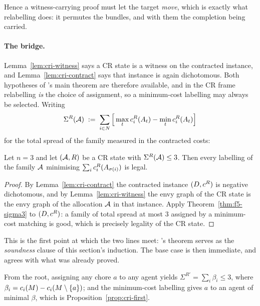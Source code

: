Hence a witness-carrying proof must let the target \emph{move}, which is exactly
what relabelling does: it permutes the bundles, and with them the completion
being carried.

\paragraph{The bridge.} Lemma~\ref{lem:cri-witness} says a CR state is a witness
on the contracted instance, and Lemma~\ref{lem:cri-contract} says that instance
is again dichotomous. Both hypotheses of 's main theorem are
therefore available, and in the CR frame relabelling \emph{is} the choice of
assignment, so a minimum-cost labelling may always be selected. Writing
\[
  \Sigma^{R}(\mathcal{A}) \;:=\; \sum_{i \in N}
  \Big[\max_t c^{R}_i(A_{t}) - \min_t c^{R}_i(A_{t})\Big]
\]
for the total spread of the family measured in the contracted costs:

\begin{theorem}[Bridge]
\label{thm:cri-bridge}
Let $n = 3$ and let $(\mathcal{A}, R)$ be a CR state with $\Sigma^{R}(\mathcal{A}) \le 3$.
Then every labelling of the family $\mathcal{A}$ minimising
$\sum_i c^{R}_i(A_{\sigma(i)})$ is legal.
\end{theorem}

\begin{proof}
By Lemma~\ref{lem:cri-contract} the contracted instance $(D, c^{R})$ is
negative dichotomous, and by Lemma~\ref{lem:cri-witness} the envy graph of the CR
state is the envy graph of the allocation $\mathcal{A}$ in that instance. Apply
Theorem~\ref{thm:f5-sigma3} to $(D,c^{R})$: a family of total spread at most
$3$ assigned by a minimum-cost matching is good, which is precisely legality of
the CR state.
\end{proof}

This is the first point at which the two lines meet: 's
theorem serves as the \emph{soundness} clause of this section's induction. The
base case is then immediate, and agrees with what was already proved.

\begin{corollary}
\label{cor:cri-base}
From the root, assigning any chore $a$ to any agent yields
$\Sigma^{R'} = \sum_i \beta_i \le 3$, where
$\beta_i = c_i(M) - c_i(M \setminus \left\{a\right\})$; and the
minimum-cost labelling gives $a$ to an agent of minimal $\beta$, which is
Proposition~\ref{prop:cri-first}.
\end{corollary}

